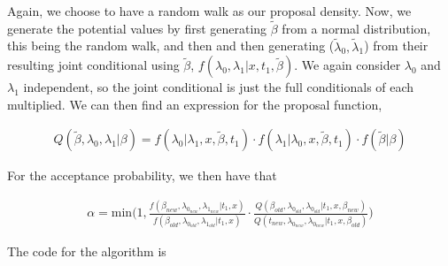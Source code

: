 Again, we choose to have a random walk as our proposal density. Now, we generate the potential values by first generating $\widetilde{\beta}$ from a normal distribution, this being the random walk, and then and then generating ($\widetilde{\lambda}_0, \widetilde{\lambda}_1$) from their resulting joint conditional using $\widetilde{\beta}$, $f(\lambda_0, \lambda_1|x,t_1,\widetilde{\beta})$. 
We again consider $\lambda_0$ and $\lambda_1$ independent, so the joint conditional is just the full conditionals of each multiplied. We can then find an expression for the proposal function,

\begin{align}
    Q(\widetilde{\beta}, \lambda_0, \lambda_1| \beta) = f(\lambda_0| \lambda_1, x, \widetilde{\beta}, t_1)\cdot f(\lambda_1| \lambda_0, x, \widetilde{\beta}, t_1)\cdot f(\widetilde{\beta}| \beta) 
\end{align}




For the acceptance probability, we then have that 

\begin{align}
    \alpha = \text{min} \Bigg(1,  \frac{
    f(\beta_{new}, \lambda_{0_{new}}, \lambda_{1_{new}}|t_1, x)}{f(\beta_{old}, \lambda_{0_{old}}, \lambda_{1_{old}}|t_1, x)}
    \cdot 
    \frac{Q(\beta_{old}, \lambda_{0_{old}}, \lambda_{0_{old}} | t_1, x, \beta_{new})}{Q(t_{new}, \lambda_{0_{new}}, \lambda_{0_{new}} | t_1, x, \beta_{old})} \Bigg) %
\end{align}




The code for the algorithm is 







